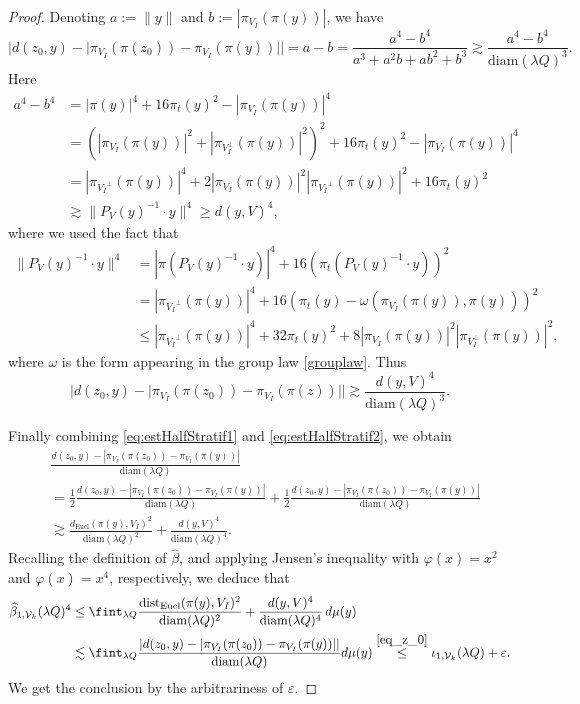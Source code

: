 \documentclass[12pt]{amsart}
\newcommand{\diam}{{\rm diam}}
\numberwithin{equation}{section}
\theoremstyle{plain}
\theoremstyle{definition}
\theoremstyle{remark}
\begin{document}
\begin{proof}
Denoting $a:=\|y\|$ and $b:=|\pi_{V_I}(\pi(y))|$, we have
\begin{displaymath}
     |d(z_0,y)-|\pi_{V_I}(\pi(z_0))-\pi_{V_I}(\pi(y))||= a-b = \frac{a^4-b^4}{a^3 + a^2 b + ab^2 + b^3}\gtrsim \frac{a^4-b^4}{\mathrm{diam}(\lambda Q)^3}.
\end{displaymath} Here
\begin{align*}
    a^4 -b^4 &= |\pi(y)|^4 + 16 \pi_t(y)^2 - |\pi_{V_I}(\pi(y))|^4\\
    &=(|\pi_{V_I}(\pi(y))|^2 +|\pi_{V_I^{\bot}}(\pi(y))|^2)^2 + 16 \pi_t(y)^2 - |\pi_{V_I}(\pi(y))|^4\\
    &= |\pi_{{V_I}^{\bot}}(\pi(y))|^4 + 2 |\pi_{V_I}(\pi(y))|^2 |\pi_{{V_I}^{\bot}}(\pi(y))|^2 + 16 \pi_t(y)^2\\
    &\gtrsim \|P_V(y)^{-1}\cdot y\|^4\geq d(y,V)^4,
\end{align*}
where we used the fact that \begin{align*}\|P_V(y)^{-1}\cdot y\|^4&=|\pi(P_V(y)^{-1}\cdot y)|^4+16(\pi_t(P_V(y)^{-1}\cdot y))^2\\&=|\pi_{{V_I}^\bot}(\pi(y))|^4+16(\pi_t(y)-\omega(\pi_{V_I}(\pi(y)),\pi(y)))^2\\ &\leq |\pi_{{V_I}^\bot}(\pi(y))|^4+32\pi_t(y)^2+8|\pi_{V_I}(\pi(y))|^2 |\pi_{V_I^{\bot}}(\pi(y))|^2,\end{align*}
where $\omega$ is the form appearing in the group law \eqref{grouplaw}.
Thus
\begin{equation}\label{eq:estHalfStratif2}
     |d(z_0,y)-|\pi_{V_I}(\pi(z_0))-\pi_{V_I}(\pi(z))|| \gtrsim \frac{d(y,V)^4}{\mathrm{diam}(\lambda Q)^3}.
\end{equation} 

Finally combining \eqref{eq:estHalfStratif1} and \eqref{eq:estHalfStratif2}, we obtain
  \begin{align*}
       & \frac{d(z_0,y)-|\pi_{V_I}(\pi(z_0))-\pi_{V_I}(\pi(y))|}{\mathrm{diam}(\lambda Q)}\\&= \frac{1}{2}\frac{d(z_0,y)-|\pi_{V_I}(\pi(z_0))-\pi_{V_I}(\pi(y))|}{\mathrm{diam}(\lambda Q)} + \frac{1}{2}\frac{d(z_0,y)-|\pi_{V_I}(\pi(z_0))-\pi_{V_I}(\pi(y))|}{\mathrm{diam}(\lambda Q)}\\
        &\gtrsim \frac{d_{\mathrm{Eucl}}(\pi(y),V_I)^2}{\mathrm{diam}(\lambda Q)^2}+\frac{d(y,V)^4}{\mathrm{diam}(\lambda Q)^4}.
    \end{align*}
Recalling the definition of $\widehat{\beta}$, and applying Jensen's inequality with $\varphi(x)=x^2$ and $\varphi(x)=x^4$, respectively, we  deduce that
\begin{align*}
    \widehat{\beta}_{1,\mathcal{V}_k}(\lambda Q)^4 &\leq 
    \fint_{\lambda Q} \frac{\mathrm{dist}_{\mathrm{Eucl}}(\pi(y),V_I)^2}{\mathrm{diam}(\lambda Q)^2}+\frac{d(y,V)^4}{\diam (\lambda Q)^4}\,d\mu(y)\\
    &\lesssim \fint_{\lambda Q} \frac{|d(z_0,y)-|\pi_{V_I}(\pi(z_0))-\pi_{V_I}(\pi(y))||}{\diam (\lambda Q)}d\mu(y)\stackrel{\eqref{eq_z_0}}\leq \iota_{1,\mathcal V_k}(\lambda Q)+\varepsilon.
\end{align*}
We get the conclusion by the arbitrariness of $\varepsilon$.
 \end{proof}
\end{document}
